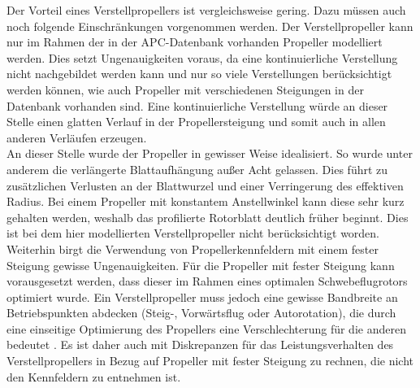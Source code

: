 Der Vorteil eines Verstellpropellers ist vergleichsweise gering. Dazu müssen auch noch folgende Einschränkungen vorgenommen werden. Der Verstellpropeller kann nur im Rahmen der in der APC-Datenbank vorhanden Propeller modelliert werden. Dies setzt Ungenauigkeiten voraus, da eine kontinuierliche Verstellung nicht nachgebildet werden kann und nur so viele Verstellungen berücksichtigt werden können, wie auch Propeller mit verschiedenen Steigungen in der Datenbank vorhanden sind. Eine kontinuierliche Verstellung würde an dieser Stelle einen glatten Verlauf in der Propellersteigung und somit auch in allen anderen Verläufen erzeugen. \\
An dieser Stelle wurde der Propeller in gewisser Weise idealisiert. So wurde unter anderem die verlängerte Blattaufhängung außer Acht gelassen. Dies führt zu zusätzlichen Verlusten an der Blattwurzel und einer Verringerung des effektiven Radius. Bei einem Propeller mit konstantem Anstellwinkel kann diese sehr kurz gehalten werden, weshalb das profilierte Rotorblatt deutlich früher beginnt. Dies ist bei dem hier modellierten Verstellpropeller nicht berücksichtigt worden. Weiterhin birgt die Verwendung von Propellerkennfeldern mit einem fester Steigung gewisse Ungenauigkeiten. Für die Propeller mit fester Steigung kann vorausgesetzt werden, dass dieser im Rahmen eines optimalen Schwebeflugrotors \cite[S.197-S.205]{Wall.2015} optimiert wurde. Ein Verstellpropeller muss jedoch eine gewisse Bandbreite an Betriebspunkten abdecken (Steig-, Vorwärtsflug oder Autorotation), die durch eine einseitige Optimierung des Propellers eine Verschlechterung für die anderen bedeutet \cite[S.203]{Wall.2015}. Es ist daher auch mit Diskrepanzen für das Leistungsverhalten des Verstellpropellers in Bezug auf Propeller mit fester Steigung zu rechnen, die nicht den Kennfeldern zu entnehmen ist. \\%
